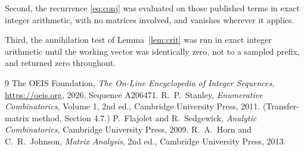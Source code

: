 \documentclass[11pt,a4paper]{article}
\theoremstyle{plain}
\theoremstyle{definition}
\begin{document}
Second, the recurrence \eqref{eq:conj} was evaluated on those published terms in exact
integer arithmetic, with no matrices involved, and vanishes wherever it applies.

Third, the annihilation test of Lemma~\ref{lem:crit} was run in exact integer arithmetic
until the working vector was identically zero, not to a sampled prefix, and returned zero
throughout.

\begin{thebibliography}{9}
 The OEIS Foundation, \emph{The On-Line Encyclopedia of Integer
Sequences}, \url{https://oeis.org}, 2026. Sequence A206471.
 R.~P.~Stanley, \emph{Enumerative Combinatorics}, Volume 1, 2nd ed.,
Cambridge University Press, 2011. (Transfer-matrix method, Section 4.7.)
 P.~Flajolet and R.~Sedgewick, \emph{Analytic Combinatorics}, Cambridge
University Press, 2009.
 R.~A.~Horn and C.~R.~Johnson, \emph{Matrix Analysis}, 2nd ed., Cambridge
University Press, 2013.
\end{thebibliography}
\end{document}
